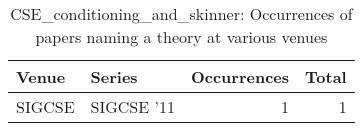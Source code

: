 \begin{table*}[t]
\begin{tabular}{llrr}
Venue & Series & Occurrences & Total\\\hline
\multirow{1}{*}{SIGCSE } & SIGCSE '11 & 1 & \multirow{1}{*}{1}\\
\end{tabular}
\caption{CSE\_conditioning\_and\_skinner: Occurrences of papers naming a theory at various venues}
\end{table*}